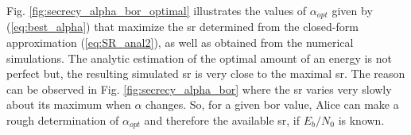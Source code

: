 Fig. \ref{fig:secrecy_alpha_bor_optimal} illustrates the values of $\alpha_{opt}$ given by (\ref{eq:best_alpha}) that maximize the \gls{sr} determined from the closed-form approximation (\ref{eq:SR_anal2}), as well as obtained from the numerical simulations. The analytic estimation of the optimal amount of \gls{an} energy is not perfect but, the resulting simulated \gls{sr} is very close to the maximal \gls{sr}. The reason can be observed in Fig. \ref{fig:secrecy_alpha_bor} where the \gls{sr} varies very slowly about its maximum when $\alpha$ changes. So, for a given \gls{bor} value, Alice can make a rough determination of $\alpha_{opt}$ and therefore the available \gls{sr}, if $E_b/N_0$ is known.  







